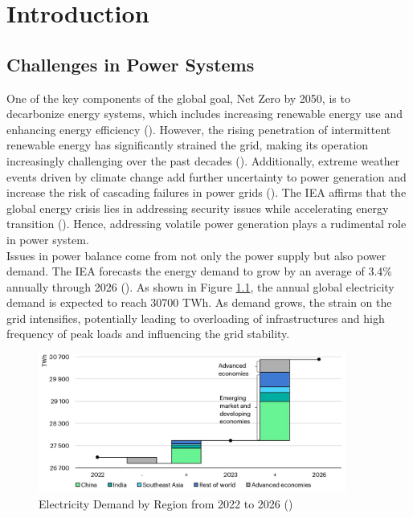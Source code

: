 
\chapter{Introduction}\label{chapter:Introduction}
\renewcommand{\thepage}{\arabic{page}}
\setcounter{page}{1}
\section{Challenges in Power Systems}
One of the key components of the global goal, Net Zero by 2050, is to decarbonize energy systems, which includes increasing renewable energy use and enhancing energy efficiency (\cite{bouckaert2021net}). However, the rising penetration of intermittent renewable energy has significantly strained the grid, making its operation increasingly challenging over the past decades (\cite{shah2015review, impram2020challenges}). Additionally, extreme weather events driven by climate change add further uncertainty to power generation and increase the risk of cascading failures in power grids (\cite{bhusal2020power, xu2024resilience}). The \gls{IEA} affirms that the global energy crisis lies in addressing security issues while accelerating energy transition (\cite{world2023outlook}). Hence, addressing volatile power generation plays a rudimental role in power system.\\
Issues in power balance come from not only the power supply but also power demand. The \gls{IEA} forecasts the energy demand to grow by an average of 3.4\% annually through 2026  (\cite{electricity2024analysis}). As shown in Figure \ref{fig:DemandRegional}, the annual global electricity demand is expected to reach 30700 TWh. As demand grows, the strain on the grid intensifies, potentially leading to overloading of infrastructures and high frequency of peak loads and influencing the grid stability.\\
\begin{figure}[h!]
\begin{center}
\includegraphics[width=0.9\textwidth]{LaTeX_Vorlagen_Studienarbeiten/images/Global Energy Demand 2022-2026 by region.jpeg}
\caption{Electricity Demand by Region from 2022 to 2026 (\cite{electricity2024analysis})}
\label{fig:DemandRegional}
\end{center}
\end{figure}


